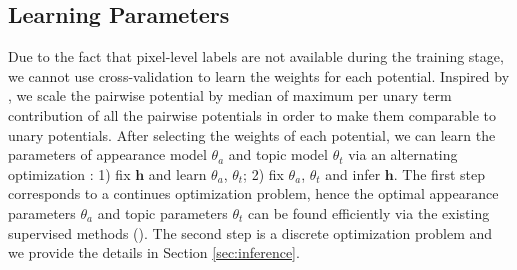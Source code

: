 \subsection{Learning Parameters}
Due to the fact that pixel-level labels are not available during the training stage, we cannot use cross-validation \cite{kohli2009robust} to learn the weights for each potential. Inspired by \cite{vezhnevets2011weakly}, we scale the pairwise potential by median of maximum per unary term contribution of all the pairwise potentials in order to make them comparable to unary potentials. After selecting the weights of each potential, we can learn the parameters of appearance model $\theta_a$ and topic model $\theta_t$ via an alternating optimization \cite{vezhnevets2011weakly}: 1) fix $\boldsymbol{h}$ and learn $\theta_a$, $\theta_t$; 2) fix $\theta_a$, $\theta_t$ and infer $\boldsymbol{h}$. The first step corresponds to a continues optimization problem, hence the optimal appearance parameters $\theta_a$ and topic parameters $\theta_t$ can be found efficiently via the existing supervised methods (\eg \cite{shotton2006textonboost}). The second step is a discrete optimization problem and we provide the details in Section \ref{sec:inference}.

